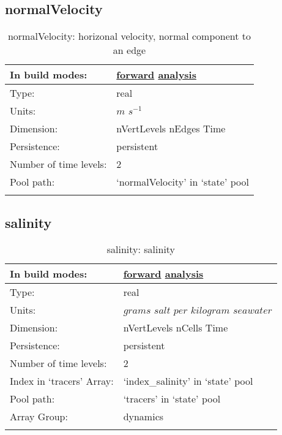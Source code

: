 \subsection[normalVelocity]{normalVelocity}
\label{subsec:var_sec_state_normalVelocity}
\begin{center}
\begin{longtable}{| p{2.0in} | p{4.0in} |}
        \hline 
        In build modes: & \hyperref[subsec:forward_var_tab_state]{forward} \hyperref[subsec:analysis_var_tab_state]{analysis} \\
        \hline 
        Type: & real \\
        \hline 
        Units: & $m$ $s^{-1}$ \\
        \hline 
        Dimension: & nVertLevels nEdges Time \\
        \hline 
        Persistence: & persistent \\
        \hline 
        Number of time levels: & 2 \\
        \hline 
            Pool path: & `normalVelocity' in `state' pool \\
		 \hline 
    \caption{normalVelocity: horizonal velocity, normal component to an edge}
\end{longtable}
\end{center}
\subsection[salinity]{salinity}
\label{subsec:var_sec_state_salinity}
\begin{center}
\begin{longtable}{| p{2.0in} | p{4.0in} |}
        \hline 
        In build modes: & \hyperref[subsec:forward_var_tab_state]{forward} \hyperref[subsec:analysis_var_tab_state]{analysis} \\
        \hline 
        Type: & real \\
        \hline 
        Units: & $grams$ $salt$ $per$ $kilogram$ $seawater$ \\
        \hline 
        Dimension: & nVertLevels nCells Time \\
        \hline 
        Persistence: & persistent \\
        \hline 
        Number of time levels: & 2 \\
        \hline 
		 Index in `tracers' Array: & `index\_salinity' in `state' pool \\
		 \hline 
            Pool path: & `tracers' in `state' pool \\
		 \hline 
		 Array Group: & dynamics \\
		 \hline 
    \caption{salinity: salinity}
\end{longtable}
\end{center}
